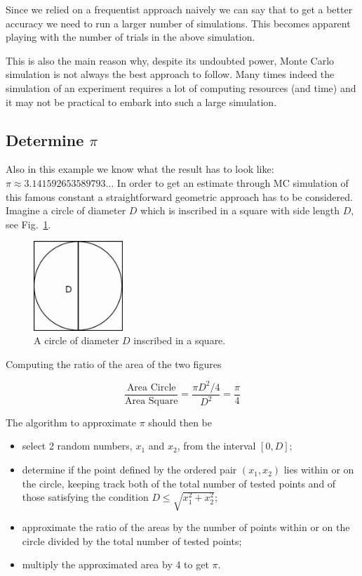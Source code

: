 Since we relied on a frequentist approach naively we can say that to get a better accuracy we need to run a larger number of simulations. This becomes apparent playing with the number of trials in the above simulation. 

This is also the main reason why, despite its undoubted power, Monte Carlo simulation is not always the best approach to follow.
Many times indeed the simulation of an experiment requires a lot of computing resources (and time) and it may not be practical to embark into such a large simulation.

\subsection{Determine \(\pi\)}
\label{determine-pi}

Also in this example we know what the result has to look like: \(\pi\approx 3.141592653589793\ldots\) In order to get an estimate through MC simulation of this famous constant a straightforward geometric approach has to be considered. Imagine a circle of diameter \(D\) which is inscribed in a square with side length \(D\), see Fig.~\ref{fig:circle_inscribed}.

\begin{figure}[htb]
	\centering
	\includegraphics[width=0.3\textwidth]{figures/circle_inscribed.jpeg}
	\caption{A circle of diameter $D$ inscribed in a square.}
	\label{fig:circle_inscribed}
\end{figure}

Computing the ratio of the area of the two figures

\begin{equation}
\frac{\textrm{Area Circle}}{\textrm{Area Square}} = \frac{\pi D^2/4}{D^2} = \frac{\pi}{4} 
\end{equation}

The algorithm to approximate \(\pi\) should then be

\begin{itemize}
\item select 2 random numbers, \(x_1\) and \(x_2\), from the interval
\([0,D]\); 
\item determine if the point defined by the ordered pair
\((x_1, x_2)\) lies within or on the circle, keeping track both of the total number of tested points and of those satisfying the condition \(D \le\sqrt{x_1^2 + x_2^2}\); 
\item approximate the ratio of the areas by the number of points within or on the circle divided by the total number of tested points; 
\item multiply the approximated area by 4 to get \(\pi\).
\end{itemize}

